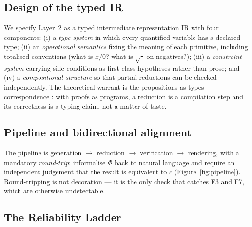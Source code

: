 \documentclass[11pt,a4paper]{article}
\theoremstyle{plain}
\theoremstyle{remark}
\newcommand{\IR}{\mathrm{IR}}           %
\begin{document}
\subsection{Design of the typed IR}

We specify Layer~2 as a typed intermediate representation $\IR$ with four
components: (i) a \emph{type system} in which every quantified variable has a
declared type; (ii) an \emph{operational semantics} fixing the meaning of each
primitive, including totalised conventions (what is $x/0$? what is
$\sqrt{\cdot}$ on negatives?); (iii) a \emph{constraint system} carrying side
conditions as first-class hypotheses rather than prose; and (iv) a
\emph{compositional structure} so that partial reductions can be checked
independently.  The theoretical warrant is the propositions-as-types
correspondence \cite{wadler2015propositions}: with proofs as programs, a
reduction is a compilation step and its correctness is a typing claim, not a
matter of taste.

\subsection{Pipeline and bidirectional alignment}

The pipeline is generation $\to$ reduction $\to$ verification $\to$ rendering,
with a mandatory \emph{round-trip}: informalise $\Phi$ back to natural language
and require an independent judgement that the result is equivalent to $c$
(Figure~\ref{fig:pipeline}).  Round-tripping is not decoration --- it is the
only check that catches F3 and F7, which are otherwise undetectable.

\subsection{The Reliability Ladder}
\end{document}
